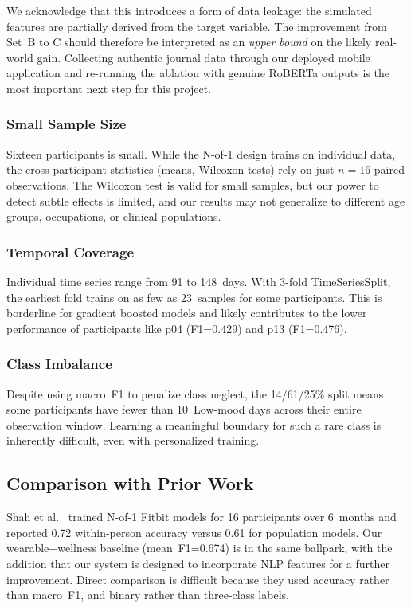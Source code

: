 \documentclass[conference]{IEEEtran}
\begin{document}
We acknowledge that this introduces a form of data leakage: the simulated features are partially derived from the target variable. The improvement from Set~B to C should therefore be interpreted as an \textit{upper bound} on the likely real-world gain. Collecting authentic journal data through our deployed mobile application and re-running the ablation with genuine RoBERTa outputs is the most important next step for this project.

\subsubsection{Small Sample Size}

Sixteen participants is small. While the N-of-1 design trains on individual data, the cross-participant statistics (means, Wilcoxon tests) rely on just $n=16$ paired observations. The Wilcoxon test is valid for small samples, but our power to detect subtle effects is limited, and our results may not generalize to different age groups, occupations, or clinical populations.

\subsubsection{Temporal Coverage}

Individual time series range from 91 to 148~days. With 3-fold TimeSeriesSplit, the earliest fold trains on as few as 23~samples for some participants. This is borderline for gradient boosted models and likely contributes to the lower performance of participants like p04 (F1=0.429) and p13 (F1=0.476).

\subsubsection{Class Imbalance}

Despite using macro~F1 to penalize class neglect, the 14/61/25\% split means some participants have fewer than 10~Low-mood days across their entire observation window. Learning a meaningful boundary for such a rare class is inherently difficult, even with personalized training.

\subsection{Comparison with Prior Work}

Shah et al.~\cite{shah2021} trained N-of-1 Fitbit models for 16 participants over 6~months and reported 0.72 within-person accuracy versus 0.61 for population models. Our wearable+wellness baseline (mean~F1=0.674) is in the same ballpark, with the addition that our system is designed to incorporate NLP features for a further improvement. Direct comparison is difficult because they used accuracy rather than macro~F1, and binary rather than three-class labels.
\end{document}
